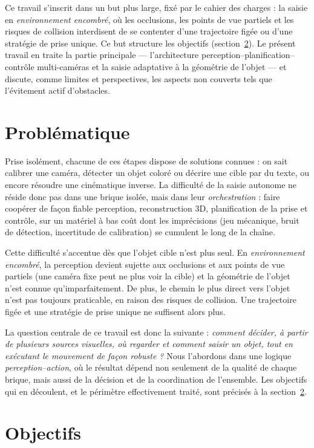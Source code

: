 Ce travail s'inscrit dans un but plus large, fixé par le cahier des charges : la saisie en \emph{environnement encombré}, où les occlusions, les points de vue partiels et les risques de collision interdisent de se contenter d'une trajectoire figée ou d'une stratégie de prise unique. Ce but structure les objectifs (section~\ref{sec:objectifs}). Le présent travail en traite la partie principale --- l'architecture perception--planification--contrôle multi-caméras et la saisie adaptative à la géométrie de l'objet --- et discute, comme limites et perspectives, les aspects non couverts tels que l'évitement actif d'obstacles.

\section{Problématique}

Prise isolément, chacune de ces étapes dispose de solutions connues : on sait calibrer une caméra, détecter un objet coloré ou décrire une cible par du texte, ou encore résoudre une cinématique inverse. La difficulté de la saisie autonome ne réside donc pas dans une brique isolée, mais dans leur \emph{orchestration} : faire coopérer de façon fiable perception, reconstruction 3D, planification de la prise et contrôle, sur un matériel à bas coût dont les imprécisions (jeu mécanique, bruit de détection, incertitude de calibration) se cumulent le long de la chaîne.

Cette difficulté s'accentue dès que l'objet cible n'est plus seul. En \emph{environnement encombré}, la perception devient sujette aux occlusions et aux points de vue partiels (une caméra fixe peut ne plus voir la cible) et la géométrie de l'objet n'est connue qu'imparfaitement. De plus, le chemin le plus direct vers l'objet n'est pas toujours praticable, en raison des risques de collision. Une trajectoire figée et une stratégie de prise unique ne suffisent alors plus.

La question centrale de ce travail est donc la suivante : \emph{comment décider, à partir de plusieurs sources visuelles, où regarder et comment saisir un objet, tout en exécutant le mouvement de façon robuste ?} Nous l'abordons dans une logique \emph{perception--action}, où le résultat dépend non seulement de la qualité de chaque brique, mais aussi de la décision et de la coordination de l'ensemble. Les objectifs qui en découlent, et le périmètre effectivement traité, sont précisés à la section~\ref{sec:objectifs}.

\section{Objectifs}
\label{sec:objectifs}

